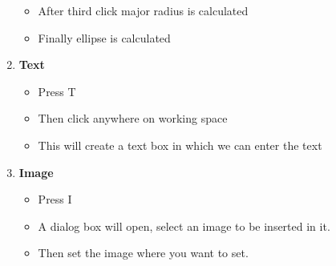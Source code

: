 \begin{enumerate}
\begin{itemize}
\item After third click major radius is calculated
\item Finally ellipse is calculated
\end{itemize}
\item \textbf{Text}
\begin{itemize}
\item Press T
\item Then click anywhere on working space
\item This will create a text box in which we can enter the text
\end{itemize}
\item \textbf{Image}
\begin{itemize}
\item Press I
\item A dialog box will open, select an image to be inserted in it.
\item Then set the image where you want to set.
\end{itemize}
\end{enumerate}